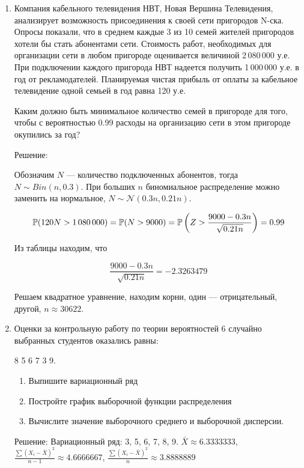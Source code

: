 \documentclass[12pt, a4paper]{article}\usepackage[]{graphicx}\usepackage[]{color}
\newcommand{\cN}{\mathcal{N}}
\begin{document}
\begin{enumerate}
					\item Компания кабельного телевидения НВТ, Новая Вершина Телевидения, анализирует возможность присоединения к своей сети пригородов N-ска. Опросы показали, что в среднем каждые 3 из 10 семей жителей пригородов хотели бы стать абонентами сети. Стоимость работ, необходимых для организации сети в любом пригороде оценивается величиной 2\,080\,000 у.е. При подключении каждого пригорода НВТ надеется получить 1\,000\,000 у.е. в год от рекламодателей. Планируемая чистая прибыль от оплаты за кабельное телевидение одной семьей в год равна 120 у.е.

					Каким должно быть минимальное количество семей в пригороде для того, чтобы с вероятностью 0.99 расходы на организацию сети в этом пригороде окупились за год?


					Решение:

					Обозначим $N$ — количество подключенных абонентов, тогда $N\sim Bin(n,0.3)$. При больших $n$ биномиальное распределение можно заменить на нормальное, $N\sim \cN(0.3n,0.21n)$.

					\[ \P(120N>1\,080\,000)=\P(N>9000)=\P\left(Z>\frac{9000-0.3n}{\sqrt{0.21n}}\right)=0.99 \]

					Из таблицы находим, что

					\[ \frac{9000-0.3n}{\sqrt{0.21n}}=-2.3263479\]



					Решаем квадратное уравнение, находим корни, один — отрицательный, другой, $n\approx 30622$.



					\item Оценки за контрольную работу по теории вероятностей 6 случайно выбранных студентов оказались равны:

					8 5 6 7 3 9.

					\begin{enumerate}
						\item Выпишите вариационный ряд
						\item Постройте график выборочной функции распределения
						\item Вычислите значение выборочного среднего и выборочной дисперсии.
					\end{enumerate}




					Решение: Вариационный ряд: 3, 5, 6, 7, 8, 9. $\bar{X}\approx 6.3333333$,
					$\frac{\sum (X_i-\bar{X})^2}{n-1}\approx 4.6666667$,
					$\frac{\sum (X_i-\bar{X})^2}{n}\approx 3.8888889$






\end{enumerate}
\end{document}
